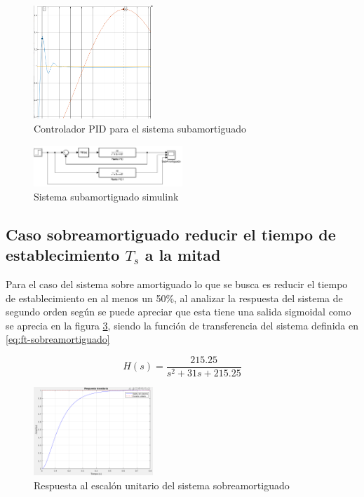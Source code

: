 \documentclass[conference]{IEEEtran}
\begin{document}
	
	\begin{figure}[h]
		\centering
		\includegraphics[width=0.4\textwidth]{media1/pid-subamortiguado}
		\caption{Controlador PID para el sistema subamortiguado}
		\label{fig:pid-subamortiguado}
	\end{figure}
	
	
	\begin{figure}[h]
		\centering
		\includegraphics[width=0.5\textwidth]{media1/subamortiguado-simulink}
		\caption{Sistema subamortiguado simulink}
		\label{fig:subamortiguado-simulink}
	\end{figure}
	
	
	\subsection{\textbf{Caso sobreamortiguado reducir el tiempo de establecimiento $T_s$ a la mitad}}
	
	Para el caso del sistema sobre amortiguado lo que se busca es reducir el tiempo de establecimiento en al menos un 50\%, al analizar la respuesta del sistema de segundo orden según \cite{ogata2015} se puede apreciar que esta tiene una salida sigmoidal como se aprecia en la figura \ref{fig:respuesta-escalon-sobre}, siendo la función de transferencia del sistema definida en \ref{eq:ft-sobreamortiguado}
	
	\begin{equation}
		H(s) = \frac{215.25}{s^2 + 31s + 215.25}
		\label{eq:ft-sobreamortiguado}
	\end{equation}
	
	\begin{figure}[h]
		\centering
		\includegraphics[width=0.4\textwidth]{media1/respuesta-escalon-sobre}
		\caption{Respuesta al escalón unitario del sistema sobreamortiguado}
		\label{fig:respuesta-escalon-sobre}
	\end{figure}
	
\end{document}
